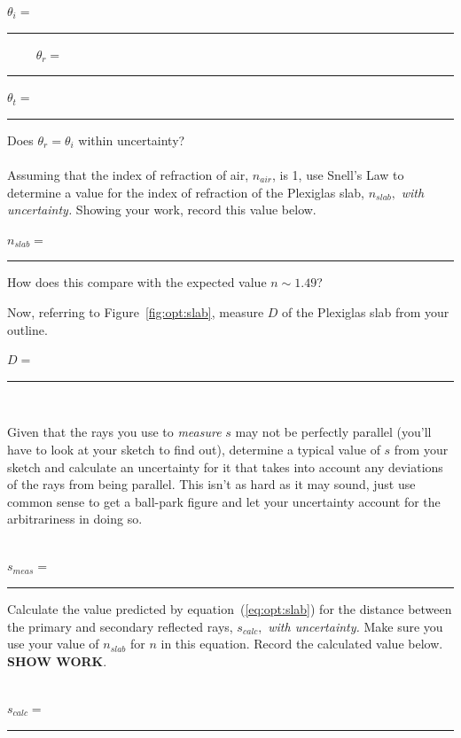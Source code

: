 \begin{center}
$\theta _i=$~ \rule{3cm}{.1mm} ~~~~
$\theta _r=$~ \rule{3cm}{.1mm}

$\theta _t=$~ \rule{3cm}{.1mm}
\end{center} 
\vspace*{.5cm}
 
\noindent Does $\theta_r=\theta_i$ within uncertainty? \\
\vspace*{2cm} \\
\noindent Assuming that the index of refraction of air, $n_{air}$, 
is 1, use Snell's Law to determine
a value for the index of refraction of the Plexiglas slab, $n_{slab},$ 
{\it with
uncertainty.} Showing your work, record this value below. \\
\vfill
\begin{center}
$n_{slab}=$~ \rule{3cm}{.1mm} 
\end{center}
\newpage
\noindent  How does this compare with the expected value
$n\sim 1.49$? \\
\vspace*{1cm}

\noindent Now, referring to Figure~\ref{fig:opt:slab}, measure $D$ of 
the Plexiglas slab from your outline. \\
\begin{center}
$D=$~ \rule{3cm}{.1mm} ~~~~
\end{center}
\noindent  Given that the rays you use to {\it measure} $s$
may not be perfectly parallel (you'll have to look at your sketch to find out),
determine a typical value of $s$ from your sketch and calculate an uncertainty
for it that takes into account any deviations of the rays from being parallel.
This isn't as hard as it may sound, just use common sense to get a ball-park
figure and let your uncertainty account for the arbitrariness in doing so. \\
\vspace*{2cm} \\
\begin{center}
$s_{meas}=$~ \rule{3cm}{.1mm}
\end{center}

\noindent
Calculate the value predicted by equation~(\ref{eq:opt:slab}) for
the distance between the primary and secondary reflected rays,
$s_{calc},$ {\it with uncertainty.}  Make sure you use your value of
$n_{slab}$ for $n$ in this equation.  Record the calculated value
below. {\bf SHOW WORK}. \\
\vspace*{7cm} \\
\begin{center}
$s_{calc}=$~ \rule{3cm}{.1mm}
\end{center}


